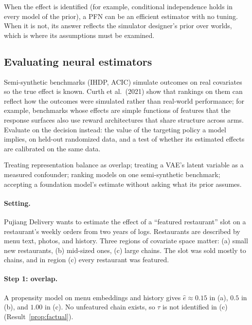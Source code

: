 \documentclass[11pt]{article}
\begin{document}
When the effect is identified (for example, conditional independence holds in every model of the prior), a PFN can
be an efficient estimator with no tuning. When it is not, its answer reflects the simulator designer's prior over
worlds, which is where its assumptions must be examined.

\subsection{Evaluating neural estimators}

Semi-synthetic benchmarks (IHDP, ACIC) simulate outcomes on real covariates so the true effect is known. Curth et al.\
(2021) show that rankings on them can reflect how the outcomes were simulated rather than real-world performance; for
example, benchmarks whose effects are simple functions of features that the response surfaces also use reward
architectures that share structure across arms. Evaluate on the decision instead: the value of the targeting policy a
model implies, on held-out randomized data, and a test of whether its estimated effects are calibrated on
the same data.

\begin{pitfall}
Treating representation balance as overlap; treating a VAE's latent variable as a measured confounder; ranking models
on one semi-synthetic benchmark; accepting a foundation model's estimate without asking what its prior assumes.
\end{pitfall}

\sectiontwo

\paragraph{Setting.} Pujiang Delivery wants to estimate the effect of a ``featured restaurant'' slot on a restaurant's weekly
orders from two years of logs. Restaurants are described by menu text, photos, and history. Three regions of covariate
space matter: (a) small new restaurants, (b) mid-sized ones, (c) large chains. The slot was sold mostly to chains, and in
region (c) every restaurant was featured.

\paragraph{Step 1: overlap.} A propensity model on menu embeddings and history gives $\hat e \approx 0.15$ in (a), $0.5$ in
(b), and $1.00$ in (c). No unfeatured chain exists, so $\tau$ is not identified in (c) (Result~\ref{prop:factual}).
\end{document}
